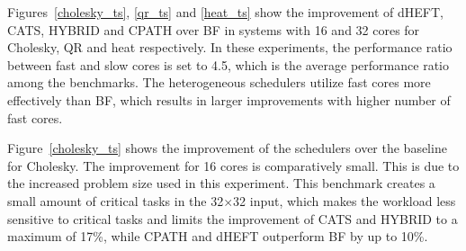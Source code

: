 Figures~\ref{cholesky_ts}, \ref{qr_ts} and \ref{heat_ts} show the improvement of dHEFT, CATS, HYBRID and CPATH over BF in systems with 16 and 32 cores for Cholesky, QR and heat respectively. In these experiments, the performance ratio between fast and slow cores is set to 4.5, which is the average performance ratio among the benchmarks. The heterogeneous schedulers utilize fast cores more effectively than BF, which results in larger improvements with higher number of fast cores. 

Figure~\ref{cholesky_ts} shows the improvement of the schedulers over the baseline for Cholesky. The improvement for 16 cores is comparatively small. This is due to the increased problem size used in this experiment.
This benchmark creates a small amount of critical tasks in the 32$\times$32 input, which makes the workload less sensitive to critical tasks and limits the improvement of CATS and HYBRID to a maximum of 17\%, while CPATH and dHEFT outperform BF by up to 10\%. 


